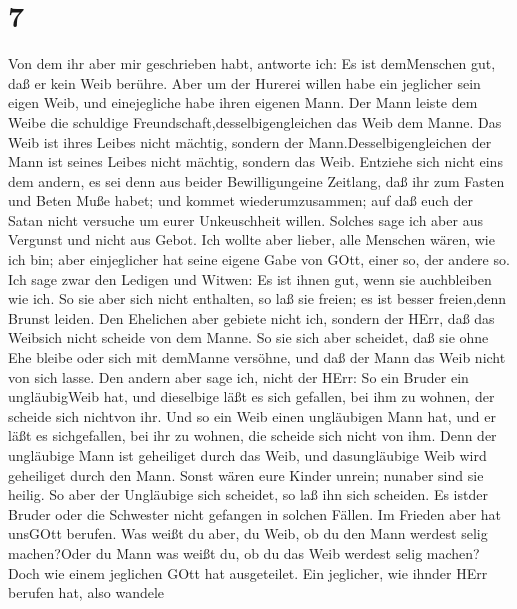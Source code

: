 \hypertarget{section-6}{%
\section{7}\label{section-6}}

 Von dem ihr aber mir geschrieben habt, antworte ich: Es ist
demMenschen gut, daß er kein Weib berühre.  Aber um der
Hurerei willen habe ein jeglicher sein eigen Weib, und einejegliche habe
ihren eigenen Mann.  Der Mann leiste dem Weibe die schuldige
Freundschaft,desselbigengleichen das Weib dem Manne.  Das
Weib ist ihres Leibes nicht mächtig, sondern der
Mann.Desselbigengleichen der Mann ist seines Leibes nicht mächtig,
sondern das Weib.  Entziehe sich nicht eins dem andern, es
sei denn aus beider Bewilligungeine Zeitlang, daß ihr zum Fasten und
Beten Muße habet; und kommet wiederumzusammen; auf daß euch der Satan
nicht versuche um eurer Unkeuschheit willen.  Solches sage
ich aber aus Vergunst und nicht aus Gebot.  Ich wollte aber
lieber, alle Menschen wären, wie ich bin; aber einjeglicher hat seine
eigene Gabe von GOtt, einer so, der andere so.  Ich sage
zwar den Ledigen und Witwen: Es ist ihnen gut, wenn sie auchbleiben wie
ich.  So sie aber sich nicht enthalten, so laß sie freien;
es ist besser freien,denn Brunst leiden.  Den Ehelichen
aber gebiete nicht ich, sondern der HErr, daß das Weibsich nicht scheide
von dem Manne.  So sie sich aber scheidet, daß sie ohne Ehe
bleibe oder sich mit demManne versöhne, und daß der Mann das Weib nicht
von sich lasse.  Den andern aber sage ich, nicht der HErr:
So ein Bruder ein ungläubigWeib hat, und dieselbige läßt es sich
gefallen, bei ihm zu wohnen, der scheide sich nichtvon ihr.
 Und so ein Weib einen ungläubigen Mann hat, und er läßt es
sichgefallen, bei ihr zu wohnen, die scheide sich nicht von ihm.
 Denn der ungläubige Mann ist geheiliget durch das Weib,
und dasungläubige Weib wird geheiliget durch den Mann. Sonst wären eure
Kinder unrein; nunaber sind sie heilig.  So aber der
Ungläubige sich scheidet, so laß ihn sich scheiden. Es istder Bruder
oder die Schwester nicht gefangen in solchen Fällen. Im Frieden aber hat
unsGOtt berufen.  Was weißt du aber, du Weib, ob du den
Mann werdest selig machen?Oder du Mann was weißt du, ob du das Weib
werdest selig machen?  Doch wie einem jeglichen GOtt hat
ausgeteilet. Ein jeglicher, wie ihnder HErr berufen hat, also wandele

